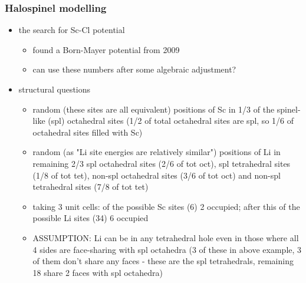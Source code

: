 \documentclass{beamer}
\begin{document}
\begin{frame}
\frametitle{Halospinel modelling}

\begin{itemize}
  \item the search for Sc-Cl potential
  \begin{itemize}
    \item found a Born-Mayer potential from 2009
    \item can use these numbers after some algebraic adjustment?
  \end{itemize}
  \item structural questions
  \begin{itemize}
    \item random (these sites are all equivalent) positions of Sc in 1/3 of the spinel-like (spl) octahedral sites (1/2 of total octahedral sites are spl, so 1/6 of octahedral sites filled with Sc)
    \item random (as "Li site energies are relatively similar") positions of Li in remaining 2/3 spl octahedral sites (2/6 of tot oct), spl tetrahedral sites (1/8 of tot tet), non-spl octahedral sites (3/6 of tot oct) and non-spl tetrahedral sites (7/8 of tot tet)
    \item taking 3 unit cells: of the possible Sc sites (6) 2 occupied; after this of the possible Li sites (34) 6 occupied
    \item ASSUMPTION: Li can be in any tetrahedral hole even in those where all 4 sides are face-sharing with spl octahedra (3 of these in above example, 3 of them don't share any faces - these are the spl tetrahedrals, remaining 18 share 2 faces with spl octahedra)
  \end{itemize}
\end{itemize}

\end{frame}
\end{document}
